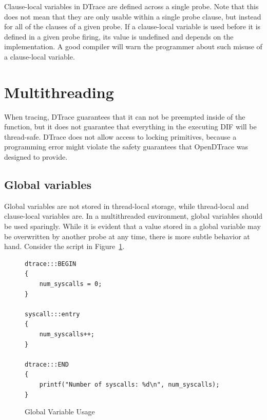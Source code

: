 Clause-local variables in DTrace are defined across a single probe. Note that
this does not mean that they are only usable within a single probe clause, but
instead for all of the clauses of a given probe. If a clause-local variable is
used before it is defined in a given probe firing, its value is undefined and
depends on the implementation. A good compiler will warn the programmer about
such misuse of a clause-local variable.

\section{Multithreading}


When tracing, DTrace guarantees that it can not be preempted inside of
the  function, but it does not guarantee that
everything in the executing DIF will be thread-safe. DTrace does not
allow access to locking primitives, because a programming error might
violate the safety guarantees that OpenDTrace was designed to provide.

\subsection{Global variables}

Global variables are not stored in thread-local storage, while
thread-local and clause-local variables are. In a multithreaded
environment, global variables should be used sparingly. While it is
evident that a value stored in a global variable may be overwritten by
another probe at any time, there is more subtle behavior at
hand. Consider the script in Figure~\ref{fig:global-var-usage}. \newline

\begin{figure}
  \begin{lstlisting}
dtrace:::BEGIN
{
    num_syscalls = 0;
}

syscall:::entry
{
    num_syscalls++;
}
    
dtrace:::END
{
    printf("Number of syscalls: %d\n", num_syscalls);
}
  \end{lstlisting}
  \caption{Global Variable Usage}
  \label{fig:global-var-usage}
\end{figure}

